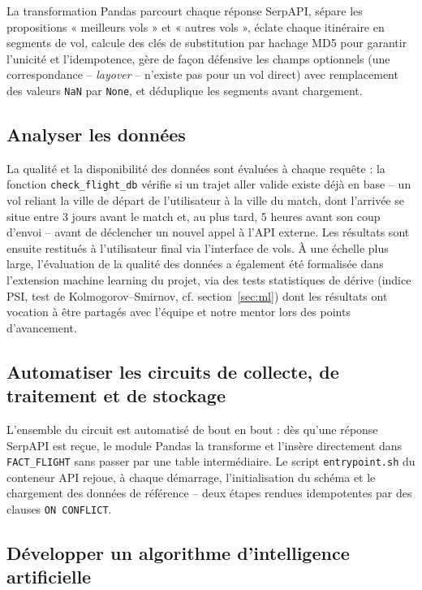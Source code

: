 \documentclass[11pt,a4paper]{report}
\newcommand{\code}[1]{\lstinline{#1}}
\begin{document}
La transformation Pandas parcourt chaque réponse SerpAPI, sépare les propositions « meilleurs vols » et « autres vols », éclate chaque itinéraire en segments de vol, calcule des clés de substitution par hachage MD5 pour garantir l'unicité et l'idempotence, gère de façon défensive les champs optionnels (une correspondance -- \emph{layover} -- n'existe pas pour un vol direct) avec remplacement des valeurs \code{NaN} par \code{None}, et déduplique les segments avant chargement.

\subsection{Analyser les données}

La qualité et la disponibilité des données sont évaluées à chaque requête : la fonction \code{check_flight_db} vérifie si un trajet aller valide existe déjà en base -- un vol reliant la ville de départ de l'utilisateur à la ville du match, dont l'arrivée se situe entre 3 jours avant le match et, au plus tard, 5 heures avant son coup d'envoi -- avant de déclencher un nouvel appel à l'API externe. Les résultats sont ensuite restitués à l'utilisateur final via l'interface de vols. À une échelle plus large, l'évaluation de la qualité des données a également été formalisée dans l'extension machine learning du projet, via des tests statistiques de dérive (indice PSI, test de Kolmogorov--Smirnov, cf. section~\ref{sec:ml}) dont les résultats ont vocation à être partagés avec l'équipe et notre mentor lors des points d'avancement.

\subsection{Automatiser les circuits de collecte, de traitement et de stockage}

L'ensemble du circuit est automatisé de bout en bout : dès qu'une réponse SerpAPI est reçue, le module Pandas la transforme et l'insère directement dans \code{FACT_FLIGHT} sans passer par une table intermédiaire. Le script \code{entrypoint.sh} du conteneur API rejoue, à chaque démarrage, l'initialisation du schéma et le chargement des données de référence -- deux étapes rendues idempotentes par des clauses \code{ON CONFLICT}.

\subsection{Développer un algorithme d'intelligence artificielle}
\end{document}
